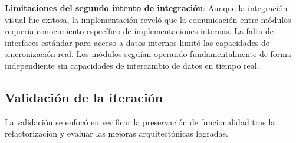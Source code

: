 \textbf{Limitaciones del segundo intento de integración}:
Aunque la integración visual fue exitosa, la implementación reveló que la comunicación entre módulos requería conocimiento específico de implementaciones internas. La falta de interfaces estándar para acceso a datos internos limitó las capacidades de sincronización real. Los módulos seguían operando fundamentalmente de forma independiente sin capacidades de intercambio de datos en tiempo real.

\subsection{Validación de la iteración}
\label{subsec:validacion_iteracion_2}

La validación se enfocó en verificar la preservación de funcionalidad tras la refactorización y evaluar las mejoras arquitectónicas logradas.

